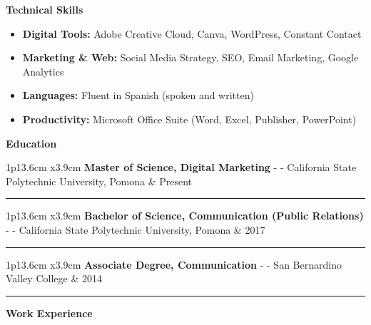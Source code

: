 \documentclass[10pt,a4paper,]{article}
\renewcommand{\section}[1]
{
	\begin{center}
		\large\textcolor{sectcol}{\textbf{#1}}
	\end{center}
}
\providecommand{\tightlist}{%
  \setlength{\itemsep}{0pt}\setlength{\parskip}{0pt}}
\newcommand{\cvevent}[4]
{

\begin{tabular*}{1\textwidth}{p{13.6cm}  x{3.9cm}}
	\textbf{#2} - \textcolor{bgcol}{#3} &   \vspace{2.5pt}\textcolor{sectcol}{#1}
\end{tabular*}

\vspace{-2pt}
\textcolor{softcol}{\hrule}
\vspace{6pt}
#4
\vspace{1em}
}
\begin{document}
\section{Technical Skills}\label{technical-skills}

\begin{itemize}
\tightlist
\item
  \textbf{Digital Tools:} Adobe Creative Cloud, Canva, WordPress,
  Constant Contact
\item
  \textbf{Marketing \& Web:} Social Media Strategy, SEO, Email
  Marketing, Google Analytics
\item
  \textbf{Languages:} Fluent in Spanish (spoken and written)
\item
  \textbf{Productivity:} Microsoft Office Suite (Word, Excel, Publisher,
  PowerPoint)
\end{itemize}

\section{Education}\label{education}

\cvevent{Present}{Master of Science, Digital Marketing}{- California State Polytechnic University, Pomona}{\empty}
\cvevent{2017}{Bachelor of Science, Communication (Public Relations)}{- California State Polytechnic University, Pomona}{\empty}
\cvevent{2014}{Associate Degree, Communication}{- San Bernardino Valley College}{\empty}

\section{Work Experience}\label{work-experience}
\end{document}
